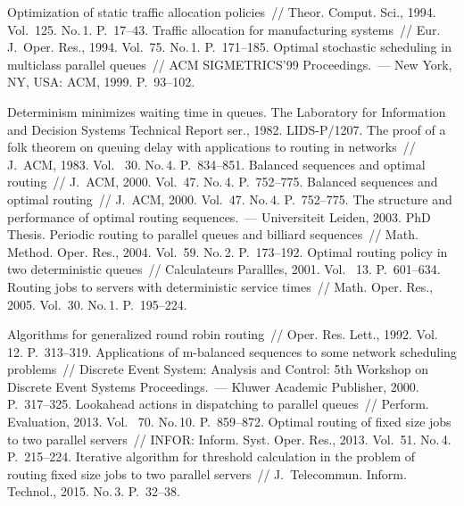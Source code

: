 \begin{multicols}{2}
{{\begin{thebibliography}{99}
     Optimization of static traffic allocation policies~// 
Theor. Comput. Sci., 1994. Vol.~125. No.\,1. P.~17--43.
     Traffic allocation for manufacturing systems~// Eur.
J.~Oper. Res., 1994. Vol.~75. No.\,1. P.~171--185.
     Optimal stochastic scheduling in multiclass parallel 
queues~// ACM SIGMETRICS'99 Proceedings.~--- New York, NY, USA: ACM, 1999.  
P.~93--102.
   
    
     Determinism minimizes waiting time in queues. The Laboratory for 
Information and Decision Systems Technical Report ser., 1982. LIDS-P/1207.
     The proof of a folk theorem on queuing delay with applications to routing in 
networks~// J.~ACM, 1983. Vol.~ 30. No.\,4. P.~834--851. 
     Balanced sequences and optimal routing~// 
J.~ACM, 2000. Vol.~47. No.\,4. P.~752--775. 
     Balanced sequences and optimal routing~// 
J.~ACM, 2000. Vol.~47. No.\,4. P.~752--775. 
     The structure and performance of optimal routing sequences.~--- 
Universiteit Leiden, 2003. PhD Thesis.
     Periodic routing to parallel queues and billiard 
sequences~// Math. Method. Oper. Res., 2004. Vol.~59. No.\,2. P.~173--192.
     Optimal routing policy in two deterministic queues~// 
Calculateurs \mbox{Parall{\!}les}, 2001. Vol.~ 13. P.~601--634.
     Routing jobs to servers with deterministic service times~// Math. 
Oper. Res., 2005. Vol.~30. No.\,1. P.~195--224.
  
     Algorithms for generalized round robin routing~// Oper. Res. 
Lett., 1992. Vol.~ 12. P.~313--319.
     Applications of m-balanced sequences to some network 
scheduling problems~// Discrete Event System: Analysis and Control: 5th Workshop on Discrete 
Event Systems  Proceedings.~--- Kluwer Academic Publisher, 2000. 
 P.~317--325.
     Lookahead actions in dispatching to parallel queues~// 
Perform. Evaluation, 2013. Vol.~ 70. No.\,10. P.~859--872.
     Optimal routing of fixed size jobs to two parallel 
servers~// INFOR: Inform. Syst. Oper. Res., 2013. Vol.~51. No.\,4. 
P.~215--224.
     Iterative algorithm for threshold calculation in the 
problem of routing fixed size jobs to two parallel servers~// J.~Telecommun. Inform. 
Technol., 2015. No.\,3. P.~32--38.
    
 \end{thebibliography}

 }
 }

\end{multicols}

